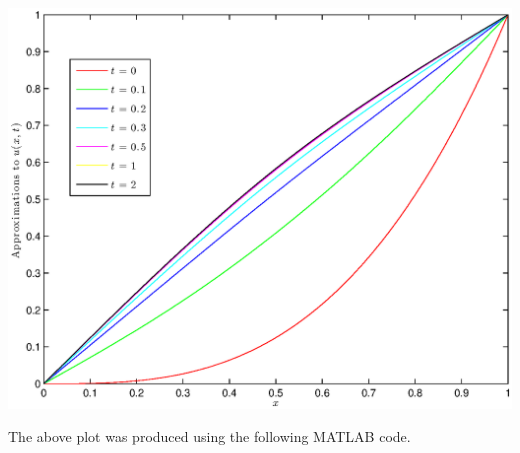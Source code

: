\begin{solution}
\begin{enumerate}
\begin{center}\includegraphics[scale=0.7]{hw39f.eps}\end{center}

The above plot was produced using the following MATLAB code.



\end{enumerate}
\end{solution}